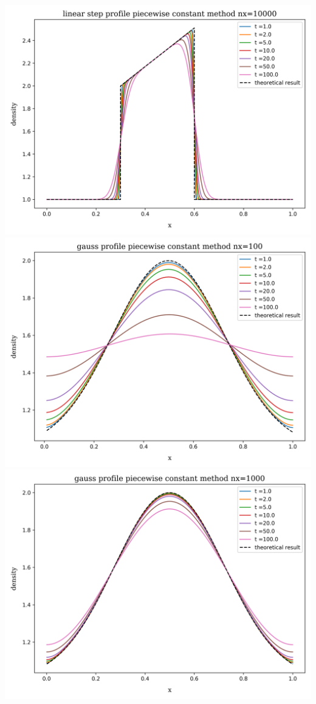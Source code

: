 \begin{frame}
\begin{columns}
			\includegraphics[height=.33\textheight]{../results/1D/pwconst/nx=10000/plot_advection_linear_step_pwconst_nx=10000.png}
			\centering
			\includegraphics[height=.33\textheight]{../results/1D/pwconst/nx=100/plot_advection_gauss_pwconst_nx=100.png}\\
			\includegraphics[height=.33\textheight]{../results/1D/pwconst/nx=1000/plot_advection_gauss_pwconst_nx=1000.png}\\

\end{columns}
\end{frame}
